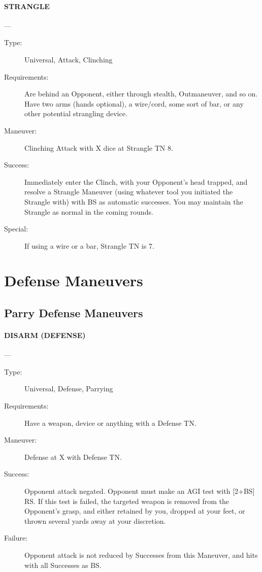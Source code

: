 \documentclass[oneside,11pt,english]{book}
\begin{document}
\paragraph{\large\label{man:STRANGLE} STRANGLE}---\quad{\large[X]}
\vspace{-10pt}\begin{description} 
\item [Type:] Universal, Attack, Clinching 
\item [Requirements:] Are behind an Opponent, either through stealth, Outmaneuver, and so on. Have two arms 
(hands optional), a wire/cord, some sort of bar, or any other potential strangling device. 
\item [Maneuver:] Clinching Attack with X dice at Strangle TN 8. 
\item [Success:] Immediately enter the Clinch, with your Opponent’s head trapped, and resolve a Strangle 
Maneuver (using whatever tool you initiated the Strangle with) with BS as automatic successes. You may 
maintain the Strangle as normal in the coming rounds. 
\item [Special:] If using a wire or a bar, Strangle TN is 7.
\end{description}

\section{Defense Maneuvers}
\subsection{Parry Defense Maneuvers}
\paragraph{\large\label{man:DISARM (DEFENSE)} DISARM (DEFENSE)}---\quad{\large[X+2]}
\vspace{-10pt}\begin{description} 
\item [Type:] Universal, Defense, Parrying 
\item [Requirements:] Have a weapon, device or anything with a Defense TN. 
\item [Maneuver:] Defense at X with Defense TN. 
\item [Success:] Opponent attack negated. Opponent must make an AGI test with [2+BS] RS. If this test is failed, 
the targeted weapon is removed from the Opponent's grasp, and either retained by you, dropped at your 
feet, or thrown several yards away at your discretion. 
\item [Failure:] Opponent attack is not reduced by Successes from this Maneuver, and hits with all Successes as 
BS.
\end{description}
\end{document}

